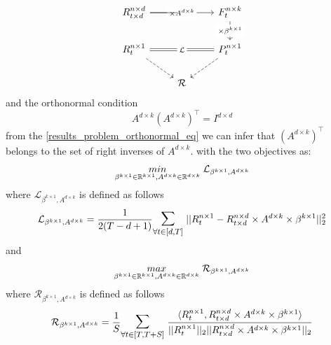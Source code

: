 \begin{equation} \label{results_problem_lfm_diagram}
\begin{tikzcd}
R^{n\times d}_{t \times d} \arrow[rr, "\times A^{d\times k}" description] \arrow[r, no head]& {}& F^{n\times k}_{t} \arrow[d, "\times \beta^{k\times 1}" description] \\
R^{n\times 1}_t \arrow[rr, "\mathcal{L}" description, Rightarrow, no head] \arrow[rd, dashed] && P^{n \times 1}_{t} \arrow[ld, dashed]\\
& \mathcal{R} &
\end{tikzcd}
\end{equation}
\newline
and the orthonormal condition
\begin{equation} \label{results_problem_orthonormal_eq}
 A^{d\times k}(A^{d\times k})^{\top} = I^{d\times d}
\end{equation}
from the \ref{results_problem_orthonormal_eq} we can infer that $(A^{d\times k})^\top$ belongs to the set of right inverses of $A^{d\times k}$. 
\newline with the two objectives as:
\begin{equation} \label{problem_lfm_loss}
\underset{\beta^{k \times 1}\in \mathbb{R}^{k\times 1}, A^{d\times k} \in \mathbb{R}^{d\times k}}{min}\hspace{1mm} \mathcal{L}_{\beta^{k \times 1}, A^{d\times k}}
\end{equation}
where $\mathcal{L}_{\beta^{k \times 1}, A^{d\times k}}$ is defined as follows
\begin{equation} \label{problem_lfm_loss_exprr}
\mathcal{L}_{\beta^{k \times 1}, A^{d\times k}} = \frac{1}{2(T-d+1)} \mathlarger{\mathlarger{\sum}}_{\forall t\in [d,T]} \hspace{1mm} ||R^{n\times 1}_t-R^{n\times d}_{t\times d}\times A^{d\times k} \times \beta^{k \times 1}||_2^2
\end{equation}
and 
\begin{equation} \label{problem_lfm_reward}
\underset{\beta^{k \times 1}\in \mathbb{R}^{k\times 1}, A^{d\times k} \in \mathbb{R}^{d\times k}}{max}\hspace{1mm} \mathcal{R}_{\beta^{k \times 1}, A^{d\times k}}
\end{equation}
where $\mathcal{R}_{\beta^{k \times 1}, A^{d\times k}}$ is defined as follows
\begin{equation} \label{problem_lfm_reward_exprr}
\mathcal{R}_{\beta^{k \times 1}, A^{d\times k}} = \frac{1}{S} \mathlarger{\mathlarger{\sum}}_{\forall t\in [T,T+S]} \hspace{1mm} \frac{\langle R^{n\times 1}_t,R^{n\times d}_{t\times d}\times A^{d\times k} \times \beta^{k \times 1}\rangle}{||R^{n\times 1}_t||_2||R^{n\times d}_{t\times d}\times A^{d\times k} \times \beta^{k \times 1}||_2}
\end{equation}
